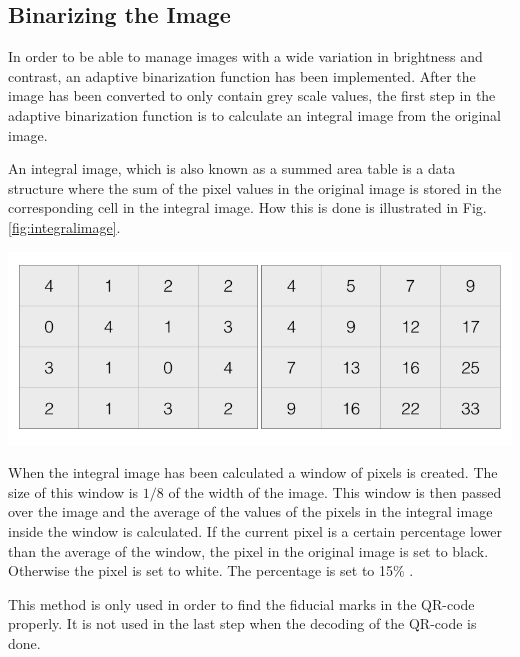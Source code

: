 \documentclass[12pt,a4paper]{article}
\newenvironment{Figure}
  {\par\medskip\noindent\minipage{\linewidth}}
  {\endminipage\par\medskip}
\begin{document}
\subsection{Binarizing the Image}
In order to be able to manage images with a wide variation in brightness and contrast, an adaptive binarization function has been implemented. After the image has been converted to only contain grey scale values, the first step in the adaptive binarization function is to calculate an integral image from the original image.

An integral image, which is also known as a summed area table \cite{bradley} is a data structure where the sum of the pixel values in the original image is stored in the corresponding cell in the integral image. How this is done is illustrated in Fig.\ref{fig:integralimage}.
\begin{Figure}
  \centering
    \includegraphics[width=1\linewidth]{./img/Integralimage.png}
\end{Figure}

When the integral image has been calculated a window of pixels is created. The size of this window is $1/8$ of the width of the image. This window is then passed over the image and the average of the values of the pixels in the integral image inside the window is calculated. If the current pixel is a certain percentage lower than the average of the window, the pixel in the original image is set to black. Otherwise the pixel is set to white. The percentage is set to 15\% \cite{bradley}. 

This method is only used in order to find the fiducial marks in the QR-code properly. It is not used in the last step when the decoding of the QR-code is done.
\end{document}
